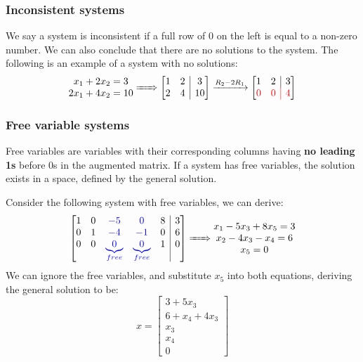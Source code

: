 \documentclass{article}
\makeatletter
\newenvironment{amatrix}[1]{%
  \left[\begin{array}{@{}*{#1}{c}|c@{}}
}{%
  \end{array}\right]
}
\makeatother
\begin{document}
\subsubsection{Inconsistent systems}
We say a system is inconsistent if a full row of 0 on the left is equal to a non-zero number. We can also conclude that there are no solutions to the system. The following is an example of a system with no solutions:
\[
\begin{matrix}
    x_1 + 2x_2 = 3\\
    2x_1 + 4x_2 = 10
\end{matrix}\xRightarrow{\hspace{0.5cm}}
\begin{amatrix}{2}
    1 & 2 & 3 \\ 2 & 4 & 10
\end{amatrix}\xrightarrow{R_2-2R_1}
\begin{amatrix}{2}
    1 & 2 & 3 \\ \mathcolor{red}{0 & 0 & 4}
\end{amatrix}
\]

\subsubsection{Free variable systems}
Free variables are variables with their corresponding columns having \textbf{no leading 1s} before 0s in the augmented matrix. If a system has free variables, the solution exists in a space, defined by the general solution.

Consider the following system with free variables, we can derive:
\[
    \begin{amatrix}{5}
        1 & 0 & \mathcolor{blue}{-5 & 0} & 8 & 3\\
        0 & 1 & \mathcolor{blue}{-4 & -1} & 0 & 6\\
        0 & 0 & \mathcolor{blue}{\underbrace{0}_{free} & \underbrace{0}_{free}} & 1 & 0
    \end{amatrix}\xRightarrow{\hspace{0.5cm}}\begin{matrix}
        x_1 -5x_3+8x_5 = 3\\
        x_2-4x_3-x_4=6\\
        x_5=0
    \end{matrix}\]
We can ignore the free variables, and substitute $x_5$ into both equations, deriving the general solution to be:
\[
    x=\begin{bmatrix}
        3+5x_3\\
        6+x_4+4x_3\\
        x_3\\
        x_4\\
        0
    \end{bmatrix}\]
\end{document}
